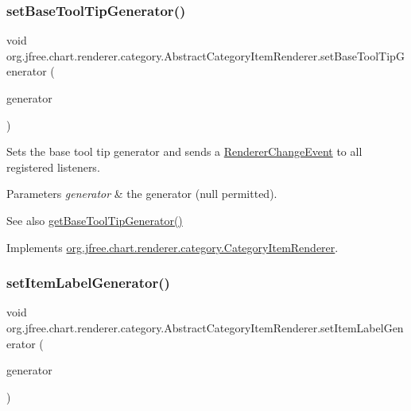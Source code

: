 \subsubsection{\texorpdfstring{set\+Base\+Tool\+Tip\+Generator()}{setBaseToolTipGenerator()}}
{\footnotesize\ttfamily void org.\+jfree.\+chart.\+renderer.\+category.\+Abstract\+Category\+Item\+Renderer.\+set\+Base\+Tool\+Tip\+Generator (\begin{DoxyParamCaption}\item[{\mbox{\hyperlink{interfaceorg_1_1jfree_1_1chart_1_1labels_1_1_category_tool_tip_generator}{Category\+Tool\+Tip\+Generator}}}]{generator }\end{DoxyParamCaption})}

Sets the base tool tip generator and sends a \mbox{\hyperlink{}{Renderer\+Change\+Event}} to all registered listeners.


\begin{DoxyParams}{Parameters}
{\em generator} & the generator ({\ttfamily null} permitted).\\
\hline
\end{DoxyParams}
\begin{DoxySeeAlso}{See also}
\mbox{\hyperlink{classorg_1_1jfree_1_1chart_1_1renderer_1_1category_1_1_abstract_category_item_renderer_a17fbafe110567ad2f86b1512fb4bd6f2}{get\+Base\+Tool\+Tip\+Generator()}} 
\end{DoxySeeAlso}


Implements \mbox{\hyperlink{interfaceorg_1_1jfree_1_1chart_1_1renderer_1_1category_1_1_category_item_renderer_a8278a41153ebf3551e122550476ab646}{org.\+jfree.\+chart.\+renderer.\+category.\+Category\+Item\+Renderer}}.

\mbox{\label{classorg_1_1jfree_1_1chart_1_1renderer_1_1category_1_1_abstract_category_item_renderer_a015b1d8609ab314a0192920d79dbdb8d}} 
\subsubsection{\texorpdfstring{set\+Item\+Label\+Generator()}{setItemLabelGenerator()}}
{\footnotesize\ttfamily void org.\+jfree.\+chart.\+renderer.\+category.\+Abstract\+Category\+Item\+Renderer.\+set\+Item\+Label\+Generator (\begin{DoxyParamCaption}\item[{\mbox{\hyperlink{interfaceorg_1_1jfree_1_1chart_1_1labels_1_1_category_item_label_generator}{Category\+Item\+Label\+Generator}}}]{generator }\end{DoxyParamCaption})}


